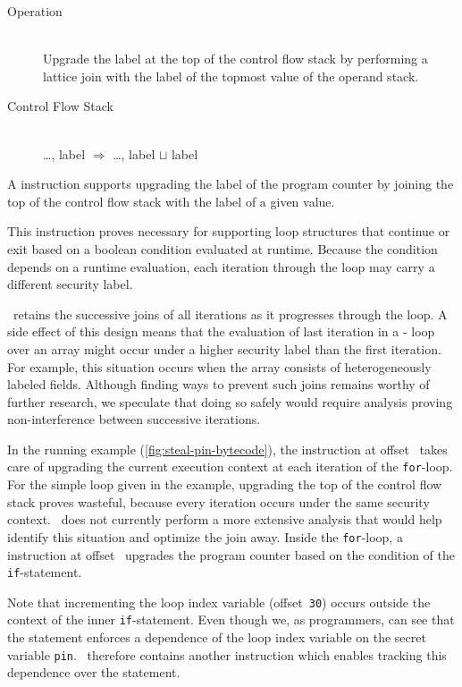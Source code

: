 \begin{samepage}
\begin{description}
\item[Operation] \hfill \\
 Upgrade the label at the top of the control flow stack by performing a lattice join with the label of the topmost value of the operand stack.
\item[Control Flow Stack] \hfill \\
 \ldots, label $\Rightarrow$ \ldots, label $\sqcup$ label
\end{description}
\end{samepage}

A \join instruction supports upgrading the label of the program counter by joining the top of the control flow stack with the label of a given value.

This instruction proves necessary for supporting loop structures that continue or exit based on a boolean condition evaluated at runtime.
Because the condition depends on a runtime evaluation, each iteration through the loop may carry a different security label.

\JitFlow\ retains the successive joins of all iterations as it progresses through the loop.
A side effect of this design means that the evaluation of last iteration in a - loop over an array might occur under a higher security label than the first iteration.
For example, this situation occurs when the array consists of heterogeneously labeled fields.
Although finding ways to prevent such joins remains worthy of further research, we speculate that doing so safely would require analysis proving non-interference between successive iterations.

In the running example (\autoref{fig:steal-pin-bytecode}), the \join instruction at offset~ takes care of upgrading the current execution context at each iteration of the \texttt{for}-loop.
For the simple loop given in the example, upgrading the top of the control flow stack proves wasteful, because every iteration occurs under the same security context.
\JitFlow\ does not currently perform a more extensive analysis that would help identify this situation and optimize the join away.
Inside the \texttt{for}-loop, a \join instruction at offset~ upgrades the program counter based on the condition of the \texttt{if}-statement.

Note that incrementing the loop index variable (offset~\texttt{30}) occurs outside the context of the inner \texttt{if}-statement.
Even though we, as programmers, can see that the  statement enforces a dependence of the loop index variable on the secret variable \texttt{pin}.
\JitFlow\ therefore contains another instruction which enables tracking this dependence over the  statement.


